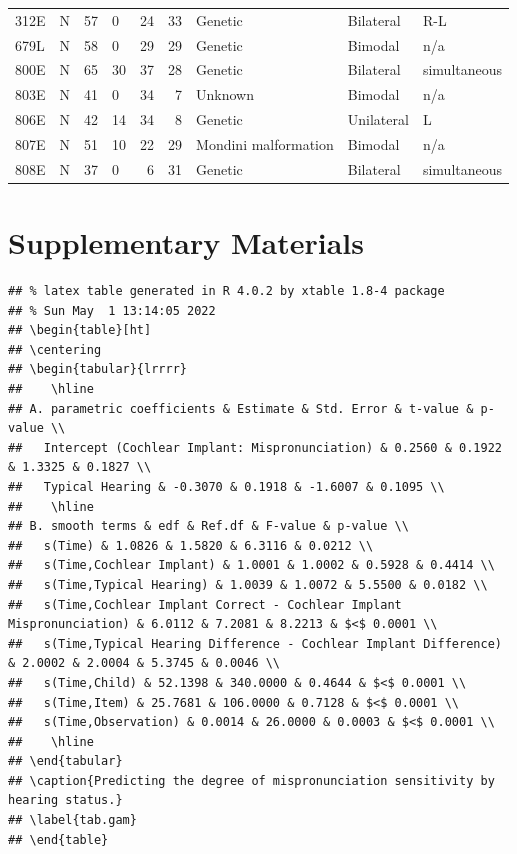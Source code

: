 \documentclass[
]{article}
\begin{document}
\begin{table}[!h]
\begin{tabular}[t]{llrlrrlll}
312E & N & 57 & 0 & 24 & 33 & Genetic & Bilateral & R-L\\
679L & N & 58 & 0 & 29 & 29 & Genetic & Bimodal & n/a\\
\addlinespace
800E & N & 65 & 30 & 37 & 28 & Genetic & Bilateral & simultaneous\\
803E & N & 41 & 0 & 34 & 7 & Unknown & Bimodal & n/a\\
806E & N & 42 & 14 & 34 & 8 & Genetic & Unilateral & L\\
807E & N & 51 & 10 & 22 & 29 & Mondini malformation & Bimodal & n/a\\
808E & N & 37 & 0 & 6 & 31 & Genetic & Bilateral & simultaneous\\
\bottomrule
\end{tabular}
\end{table}

\hypertarget{supplementary-materials}{%
\section{Supplementary Materials}\label{supplementary-materials}}

\begin{verbatim}
## % latex table generated in R 4.0.2 by xtable 1.8-4 package
## % Sun May  1 13:14:05 2022
## \begin{table}[ht]
## \centering
## \begin{tabular}{lrrrr}
##    \hline
## A. parametric coefficients & Estimate & Std. Error & t-value & p-value \\ 
##   Intercept (Cochlear Implant: Mispronunciation) & 0.2560 & 0.1922 & 1.3325 & 0.1827 \\ 
##   Typical Hearing & -0.3070 & 0.1918 & -1.6007 & 0.1095 \\ 
##    \hline
## B. smooth terms & edf & Ref.df & F-value & p-value \\ 
##   s(Time) & 1.0826 & 1.5820 & 6.3116 & 0.0212 \\ 
##   s(Time,Cochlear Implant) & 1.0001 & 1.0002 & 0.5928 & 0.4414 \\ 
##   s(Time,Typical Hearing) & 1.0039 & 1.0072 & 5.5500 & 0.0182 \\ 
##   s(Time,Cochlear Implant Correct - Cochlear Implant Mispronunciation) & 6.0112 & 7.2081 & 8.2213 & $<$ 0.0001 \\ 
##   s(Time,Typical Hearing Difference - Cochlear Implant Difference) & 2.0002 & 2.0004 & 5.3745 & 0.0046 \\ 
##   s(Time,Child) & 52.1398 & 340.0000 & 0.4644 & $<$ 0.0001 \\ 
##   s(Time,Item) & 25.7681 & 106.0000 & 0.7128 & $<$ 0.0001 \\ 
##   s(Time,Observation) & 0.0014 & 26.0000 & 0.0003 & $<$ 0.0001 \\ 
##    \hline
## \end{tabular}
## \caption{Predicting the degree of mispronunciation sensitivity by hearing status.} 
## \label{tab.gam}
## \end{table}
\end{verbatim}
\end{document}
